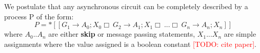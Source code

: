 We postulate that any asynchronous circuit can be completely described 
by a process P of the form:
\begin{equation}
	P = *[[ G_1 \to A_0; X_0 \Box\ G_2 \to A_1; X_1 \Box\ ... \Box\ G_n \to
	A_n; X_n ]]
\end{equation}
where $A_0.. A_n$ are either \textbf{skip} or message passing
statements, $X_1... X_n$ are simple assignments where the value assigned is a
boolean constant \textcolor{red}{[TODO: cite paper]}.

